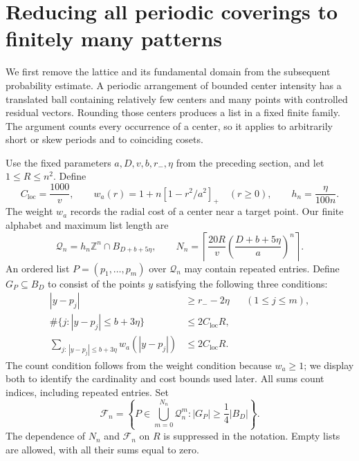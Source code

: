 \section{Reducing all periodic coverings to finitely many patterns}
\label{sec:localization}

We first remove the lattice and its fundamental domain from the subsequent
probability estimate.  A periodic arrangement of bounded center intensity
has a translated ball containing relatively few centers and many points
with controlled residual vectors.  Rounding those centers produces a list
in a fixed finite family.  The argument counts every occurrence of a center,
so it applies to arbitrarily short or skew periods and to coinciding cosets.

Use the fixed parameters $a,D,v,b,r_-,\eta$ from the preceding section,
and let $1\le R\le n^2$.  Define
\[
 C_{\mathrm{loc}}=\frac{1000}{v},\qquad
 w_a(r)=1+n[1-r^2/a^2]_+ \quad (r\ge0),
 \qquad h_n=\frac{\eta}{100n}.
\]
The weight $w_a$ records the radial cost of a center near a target point.
Our finite alphabet and maximum list length are
\begin{equation}\label{eq:local-grid}
 \mathcal Q_n=h_n\mathbb Z^n\cap B_{D+b+5\eta},\qquad
 N_n=\left\lceil\frac{20R}{v}
       \left(\frac{D+b+5\eta}{a}\right)^n\right\rceil.
\end{equation}
An ordered list $P=(p_1,\ldots,p_m)$ over $\mathcal Q_n$ may contain repeated
entries.  Define $G_P\subseteq B_D$ to consist of the points $y$ satisfying
the following three conditions:
\begin{align}
 |y-p_j|&\ge r_--2\eta &&(1\le j\le m),\label{eq:rounded-inner}\\
 \#\{j:|y-p_j|\le b+3\eta\}&\le2C_{\mathrm{loc}}R,
       \label{eq:rounded-count}\\
 \sum_{j:\,|y-p_j|\le b+3\eta}w_a(|y-p_j|)
       &\le2C_{\mathrm{loc}}R.\label{eq:rounded-weight}
\end{align}
The count condition follows from the weight condition because $w_a\ge1$;
we display both to identify the cardinality and cost bounds used later.
All sums count indices, including repeated entries.  Set
\begin{equation}\label{eq:pattern-family}
 \mathcal F_n=
 \left\{P\in\bigcup_{m=0}^{N_n}\mathcal Q_n^m:
              |G_P|\ge\frac14|B_D|\right\}.
\end{equation}
The dependence of $N_n$ and $\mathcal F_n$ on $R$ is suppressed in the
notation.  Empty lists are allowed, with all their sums equal to zero.

